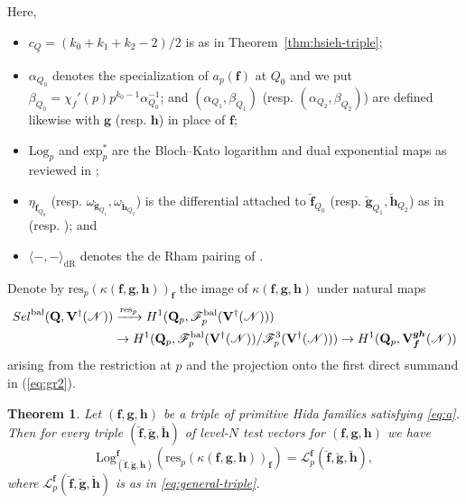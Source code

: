 \documentclass[10pt,letterpaper]{amsart}
\theoremstyle{plain}
\newtheorem{thm}{Theorem}[subsection] %
\theoremstyle{definition}
\theoremstyle{definition}
\theoremstyle{plain}
\theoremstyle{plain}
\theoremstyle{plain}
\theoremstyle{remark}
\numberwithin{equation}{section}
\newcommand{\Sel}{Sel}
\newcommand{\rH}{H}
\DeclareMathOperator{\bal}{\mathrm{bal}}
\def\cO{\mathcal O}
\newcommand{\Vdag}{{\mathbf{V}^\dagger}}
\newcommand{\Q}{\mathbf{Q}}
\def\Sel{{\rm Sel}}
\newcommand{\cR}{\mathbb{I}}
\newcommand{\bff}{{\boldsymbol{f}}}
\newcommand{\bfg}{{\boldsymbol{g}}}
\newcommand{\bfh}{{\boldsymbol{h}}}
\begin{document}
Here, 
\begin{itemize}
\item $c_{\underline{Q}}=(k_0+k_1+k_2-2)/2$ is as in Theorem~\ref{thm:hsieh-triple}; 
\item $\alpha_{Q_0}$ denotes the specialization of $a_p(\bff)$ at $Q_0$ and we put $\beta_{Q_0}=\chi_f'(p)p^{k_0-1}\alpha_{Q_0}^{-1}$; and $(\alpha_{Q_1},\beta_{Q_1})$ (resp. $(\alpha_{Q_2},\beta_{Q_2})$) are defined likewise with  $\bfg$ (resp. $\bfh$) in place of $\bff$;
\item ${\mathrm{Log}}_p$ and ${\mathrm{exp}}^*_p$ are the Bloch--Kato logarithm and dual exponential maps as reviewed in \cite[pp.\,51-52]{BSV}; 
\item $\eta_{\breve{\bff}_{Q_0}}$ (resp. $\omega_{\breve{\bfg}_{Q_1}}, \omega_{\breve{\bfh}_{Q_2}}$) is the differential attached to $\breve{\bff}_{Q_0}$ (resp. $\breve{\bfg}_{Q_1},\breve{\bfh}_{Q_2}$) as in \cite[Eq.~(30)]{BSV} (resp. \cite[Eq.~(34)]{BSV}); and 
\item $\langle-,-\rangle_{\mathrm{dR}}$ denotes the de Rham pairing of \cite[Eq.~(32)]{BSV}.
\end{itemize}

Denote by ${\mathrm{res}}_p(\kappa(\bff,\bfg,\bfh))_{\bff}$ the image of $\kappa(\bff,\bfg,\bfh)$ under natural maps
\begin{equation}\label{eq:map-ERL}
\begin{aligned}
\Sel^{\bal}(\Q,\Vdag(\mathscr{N}))&\xrightarrow{{\mathrm{res}}_p}\rH^1(\Q_p,\mathscr{F}_p^{\bal}(\Vdag(\mathscr{N})))\\ &\rightarrow\rH^1(\Q_p,\mathscr{F}_p^{\bal}(\Vdag(\mathscr{N}))/\mathscr{F}_p^3(\Vdag(\mathscr{N})))
\rightarrow\rH^1(\Q_p,\mathbf{V}_{\bff}^{\bfg\bfh}(\mathscr{N}))
\end{aligned}
\end{equation}
arising from the restriction at $p$ and the projection onto the first direct summand in (\ref{eq:gr2}).

\begin{thm}
\label{thm:ERL}
Let $(\bff,\bfg,\bfh)$ be a triple of primitive Hida families satisfying \eqref{eq:a}. Then for every triple $(\breve{\bff},\breve{\bfg},\breve{\bfh})$ of level-$N$ test vectors  for $(\bff,\bfg,\bfh)$ we have
\[
{\mathrm{Log}}^{\bff}_{(\breve{\bff},\breve{\bfg},\breve{\bfh})}({\mathrm{res}}_p(\kappa(\bff,\bfg,\bfh))_\bff)=\mathscr{L}_p^{\bff}(\breve{\bff},\breve{\bfg},\breve{\bfh}),
\]
where $\mathscr{L}_p^{\bff}(\breve{\bff},\breve{\bfg},\breve{\bfh})$ 
is as in \eqref{eq:general-triple}. 
\end{thm}
\end{document}
